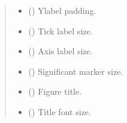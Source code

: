 \documentclass[letterpaper,10pt,english]{sphinxhowto}
\begin{document}
\begin{fulllineitems}
\begin{quote}
\begin{description}
\begin{itemize}
\item {} 
\sphinxAtStartPar
{} (\sphinxstyleliteralemphasis{\sphinxupquote{, }}) \textendash{} Y\sphinxhyphen{}label padding.

\item {} 
\sphinxAtStartPar
{} (\sphinxstyleliteralemphasis{\sphinxupquote{, }}) \textendash{} Tick label size.

\item {} 
\sphinxAtStartPar
{} (\sphinxstyleliteralemphasis{\sphinxupquote{, }}) \textendash{} Axis label size.

\item {} 
\sphinxAtStartPar
{} (\sphinxstyleliteralemphasis{\sphinxupquote{, }}) \textendash{} Significant marker size.

\item {} 
\sphinxAtStartPar
{} (\sphinxstyleliteralemphasis{\sphinxupquote{, }}) \textendash{} Figure title.

\item {} 
\sphinxAtStartPar
{} (\sphinxstyleliteralemphasis{\sphinxupquote{, }}) \textendash{} Title font size.


\end{itemize}
\end{description}
\end{quote}
\end{fulllineitems}
\end{document}

